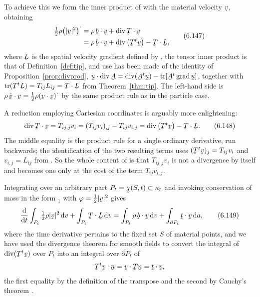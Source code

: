 To achieve this we form the inner product of  with the
material velocity $\bv$, obtaining
\begin{equation}
\begin{aligned}
   \tfrac12\rho\big(|\bv|^{2}\big)^{\textstyle\cdot}
   &=\rho\,\ip\bb\bv+\ip{\dvg\bT}\bv\\
   &=\rho\,\ip\bb\bv+\dvg\big(\bT^{t}\bv\big)-\bT\cdot\bL ,
\end{aligned}
   \tag{6.147}\label{eq:6.147}
\end{equation}
where $\bL$ is the spatial velocity gradient defined by , the
tensor inner product is that of Definition~\ref{def:tip}, and use has
been made of the identity of Proposition~\ref{prop:divprod},
$\ip\bu{\dvg\bA}=\dvg(\bA^{t}\bu)-\tr[\bA^{t}\grad\bu]$, together with
$\tr(\bT^{t}\bL)=T_{ij}L_{ij}=\bT\cdot\bL$ from
Theorem~\ref{thm:tip}. The left-hand side is
$\rho\,\ip{\dot\bv}\bv=\tfrac12\rho(\ip\bv\bv)^{\textstyle\cdot}$ by
the same product rule as in the particle case.

A reduction employing Cartesian coordinates is arguably more
enlightening:
\begin{equation}
   \ip{\dvg\bT}\bv=T_{ij,j}v_{i}=(T_{ij}v_{i})_{,j}-T_{ij}v_{i,j}
   =\dvg\big(\bT^{t}\bv\big)-\bT\cdot\bL .
   \tag{6.148}\label{eq:6.148}
\end{equation}
The middle equality is the product rule for a single ordinary
derivative, run backwards; the identification of the two resulting
terms uses $(\bT^{t}\bv)_{j}=T_{ij}v_{i}$ and $v_{i,j}=L_{ij}$ from
. So the whole content of  is that
$T_{ij,j}v_{i}$ is not a divergence by itself and becomes one only at
the cost of the term $T_{ij}v_{i,j}$.


Integrating  over an arbitrary part
$P_{t}=\bchi(S,t)\subset\kappa_{t}$ and invoking conservation of mass
in the form $_{1}$ with $\varphi=\tfrac12|\bv|^{2}$ gives
\begin{equation}
   \frac{\dl}{\dl t}\int_{P_{t}}\tfrac12\rho|\bv|^{2}\,\dl v
   +\int_{P_{t}}\bT\cdot\bL\,\dl v
   =\int_{P_{t}}\rho\,\ip\bb\bv\,\dl v
   +\int_{\partial P_{t}}\ip\bt\bv\,\dl a ,
   \tag{6.149}\label{eq:6.149}
\end{equation}
where the time derivative pertains to the fixed set $S$ of material
points, and we have used the divergence theorem for smooth fields to
convert the integral of $\dvg(\bT^{t}\bv)$ over $P_{t}$ into an
integral over $\partial P_{t}$ of
\[
   \ip{\bT^{t}\bv}\bn=\ip\bv{\bT\bn}=\ip\bt\bv ,
\]
the first equality by the definition of the transpose and the second by
Cauchy's theorem .

